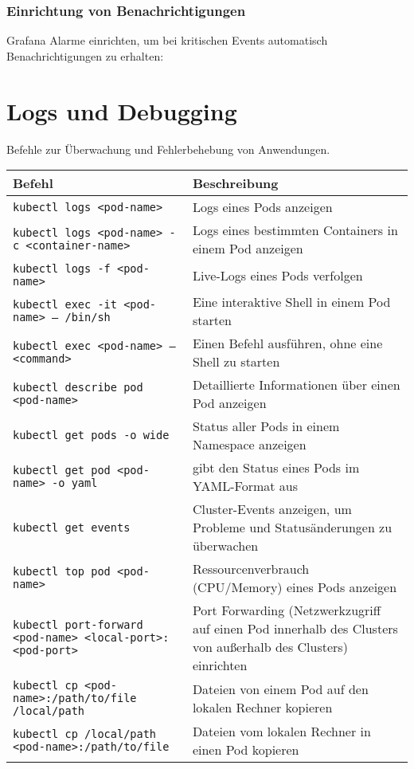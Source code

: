 \subsubsection{Einrichtung von Benachrichtigungen}
Grafana Alarme einrichten, um bei kritischen Events automatisch Benachrichtigungen zu erhalten:


\newpage

\section{Logs und Debugging}
Befehle zur Überwachung und Fehlerbehebung von Anwendungen.\\

\noindent
\begin{tabular}{|p{}|p{}|}
\hline
\textbf{Befehl} & \textbf{Beschreibung} \\
\hline
\texttt{kubectl logs <pod-name>} & Logs eines Pods anzeigen \\
\texttt{kubectl logs <pod-name> -c <container-name>} & Logs eines bestimmten Containers in einem Pod anzeigen \\
\texttt{kubectl logs -f <pod-name>} & Live-Logs eines Pods verfolgen \\
\texttt{kubectl exec -it <pod-name> -- /bin/sh} & Eine interaktive Shell in einem Pod starten \\
\texttt{kubectl exec <pod-name> -- <command>} & Einen Befehl ausführen, ohne eine Shell zu starten \\
\texttt{kubectl describe pod <pod-name>} & Detaillierte Informationen über einen Pod anzeigen \\
\texttt{kubectl get pods -o wide} & Status aller Pods in einem Namespace anzeigen\\
\texttt{kubectl get pod <pod-name> -o yaml} & gibt den Status eines Pods im YAML-Format aus\\
\texttt{kubectl get events} & Cluster-Events anzeigen, um Probleme und Statusänderungen zu überwachen \\
\texttt{kubectl top pod <pod-name>} & Ressourcenverbrauch (CPU/Memory) eines Pods anzeigen \\
\texttt{kubectl port-forward <pod-name> <local-port>:<pod-port>} & Port Forwarding (Netzwerkzugriff auf einen Pod innerhalb des Clusters von außerhalb des Clusters) einrichten\\
\texttt{kubectl cp <pod-name>:/path/to/file /local/path} & Dateien von einem Pod auf den lokalen Rechner kopieren\\
\texttt{kubectl cp /local/path <pod-name>:/path/to/file} & Dateien vom lokalen Rechner in einen Pod kopieren\\
\hline
\end{tabular}

